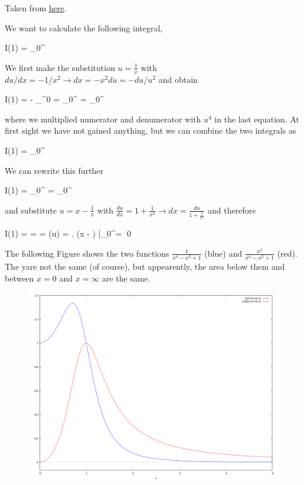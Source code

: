
Taken from \href{https://math.stackexchange.com/questions/4367988/how-to-find-exact-value-of-integral-int-0-infty-frac1-leftx4-x2}{here}.

We want to calculate the following integral,

\bee
I(1) = \int_0^\infty {}
\eee

We first make the substitution $u = \frac{1}{x}$ with $du/dx = -1/x^2 \rightarrow dx = -x^2 du = - du/u^2$ and obtain

\bee
I(1) = - \int_\infty^0  = \int_0^\infty {} = \int_0^\infty {}
\eee

where we multiplied numerator and denumerator with $u^4$ in the last equation. At first sight we have not gained anything, but we can combine the two integrals as

\bee
I(1) =  \int_0^\infty {}
\eee

We can rewrite this further

\bee
I(1) =  \int_0^\infty {} =  \int_0^\infty {}
\eee

and substitute $u = x-\frac{1}{x}$ with $\frac{du}{dx} = 1+\frac{1}{x^2} \rightarrow dx = \frac{du}{1 + \frac{1}{x^2}}$ and therefore

\bee
I(1) =  \int {}  =  \int {} =  \arctan(u) =  \left. \arctan\left(x - \right) \right|_0^\infty =  \qed
\eee

The following Figure shows the two functions $\frac{1}{x^4 - x^2 + 1}$ (blue) and $\frac{x^2}{x^4 - x^2 + 1}$ (red). The yare not the same (of course), but appearently, the area below them and between $x=0$ and $x=\infty$ are the same.

\begin{figure}[H]
    \centering
    \includegraphics[scale=0.3]{images/2022-02-14_plot_1.png}
\end{figure}




